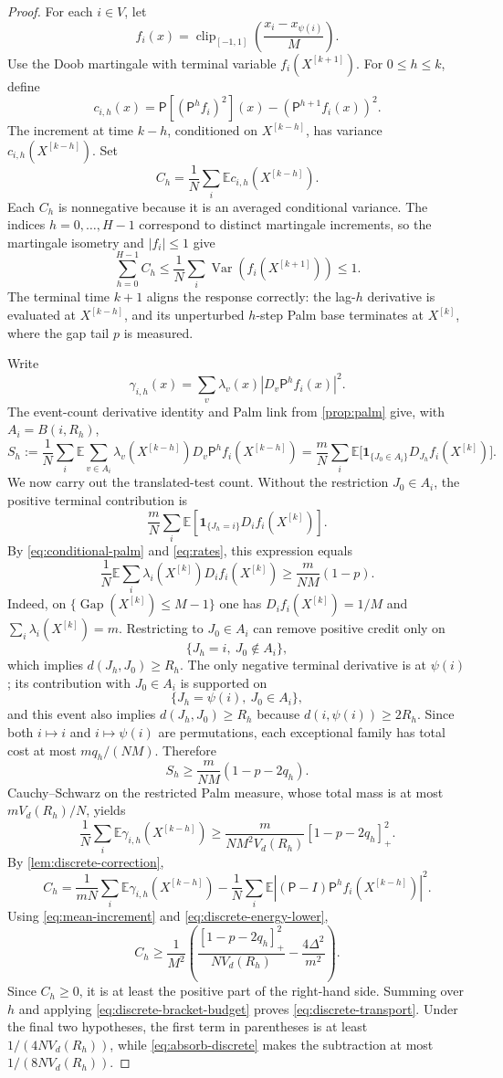 \documentclass[11pt]{article}
\theoremstyle{remark}
\newcommand{\E}{\mathbb{E}}
\newcommand{\one}{\mathbf{1}}
\newcommand{\Gap}{\operatorname{Gap}}
\newcommand{\Var}{\operatorname{Var}}
\newcommand{\clip}{\operatorname{clip}}
\begin{document}
\begin{proof}
For each $i\in V$, let
\[
 f_i(x)=\clip_{[-1,1]}\!\left(\frac{x_i-x_{\psi(i)}}M\right).
\]
Use the Doob martingale with terminal variable $f_i(X^{[k+1]})$. For $0\le h\le k$, define
\[
 c_{i,h}(x)
 =\mathsf P[(\mathsf P^hf_i)^2](x)
   -(\mathsf P^{h+1}f_i(x))^2.
\]
The increment at time $k-h$, conditioned on $X^{[k-h]}$, has variance
$c_{i,h}(X^{[k-h]})$. Set
\[
 C_h=\frac1N\sum_i\E c_{i,h}(X^{[k-h]}).
\]
Each $C_h$ is nonnegative because it is an averaged conditional variance. The indices $h=0,\ldots,H-1$ correspond to distinct martingale increments, so the martingale isometry and $|f_i|\le1$ give
\[
 \sum_{h=0}^{H-1}C_h
 \le\frac1N\sum_i\Var(f_i(X^{[k+1]}))
 \le1.
 \tag{6.7}\label{eq:discrete-bracket-budget}
\]
The terminal time $k+1$ aligns the response correctly: the lag-$h$ derivative is evaluated at $X^{[k-h]}$, and its unperturbed $h$-step Palm base terminates at $X^{[k]}$, where the gap tail $p$ is measured.

Write
\[
 \gamma_{i,h}(x)=\sum_v\lambda_v(x)
 |D_v\mathsf P^hf_i(x)|^2.
\]
The event-count derivative identity and Palm link from \cref{prop:palm} give, with $A_i=B(i,R_h)$,
\[
 S_h:=\frac1N\sum_i\E\sum_{v\in A_i}
 \lambda_v(X^{[k-h]})D_v\mathsf P^hf_i(X^{[k-h]})
 =\frac mN\sum_i\E\bigl[
 \one_{\{J_0\in A_i\}}D_{J_h}f_i(X^{[k]})
 \bigr].
\]
We now carry out the translated-test count. Without the restriction
$J_0\in A_i$, the positive terminal contribution is
\[
 \frac mN\sum_i\E\!
 \left[\one_{\{J_h=i\}}D_if_i(X^{[k]})\right].
\]
By \eqref{eq:conditional-palm} and \eqref{eq:rates}, this expression equals
\[
 \frac1N\E\sum_i\lambda_i(X^{[k]})D_if_i(X^{[k]})
 \ge \frac m{NM}(1-p).
\]
Indeed, on $\{\Gap(X^{[k]})\le M-1\}$ one has $D_if_i(X^{[k]})=1/M$ and $\sum_i\lambda_i(X^{[k]})=m$.
Restricting to $J_0\in A_i$ can remove positive credit only on
\[
 \{J_h=i,\ J_0\notin A_i\},
\]
which implies $d(J_h,J_0)\ge R_h$.  The only negative terminal derivative is
at $\psi(i)$; its contribution with $J_0\in A_i$ is supported on
\[
 \{J_h=\psi(i),\ J_0\in A_i\},
\]
and this event also implies $d(J_h,J_0)\ge R_h$ because
$d(i,\psi(i))\ge2R_h$. Since both $i\mapsto i$ and
$i\mapsto\psi(i)$ are permutations, each exceptional family has total cost
at most $mq_h/(NM)$. Therefore
\[
 S_h\ge\frac m{NM}(1-p-2q_h).
\]
Cauchy--Schwarz on the restricted Palm measure, whose total mass is at most $mV_d(R_h)/N$, yields
\[
 \frac1N\sum_i\E\gamma_{i,h}(X^{[k-h]})
 \ge
 \frac m{NM^2V_d(R_h)}[1-p-2q_h]_+^2.
 \tag{6.8}\label{eq:discrete-energy-lower}
\]
By \cref{lem:discrete-correction},
\[
 C_h
 =\frac1{mN}\sum_i\E\gamma_{i,h}(X^{[k-h]})
 -\frac1N\sum_i\E
 |(\mathsf P-I)\mathsf P^hf_i(X^{[k-h]})|^2.
\]
Using \eqref{eq:mean-increment} and \eqref{eq:discrete-energy-lower},
\[
 C_h\ge\frac1{M^2}
 \left(
 \frac{[1-p-2q_h]_+^2}{NV_d(R_h)}
 -\frac{4\Delta^2}{m^2}
 \right).
\]
Since $C_h\ge0$, it is at least the positive part of the right-hand side. Summing over $h$ and applying \eqref{eq:discrete-bracket-budget} proves \eqref{eq:discrete-transport}. Under the final two hypotheses, the first term in parentheses is at least $1/(4NV_d(R_h))$, while \eqref{eq:absorb-discrete} makes the subtraction at most $1/(8NV_d(R_h))$.
\end{proof}
\end{document}
